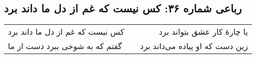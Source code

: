 \begin{center}
\section*{رباعی شماره ۳۶: کس نیست که غم از دل ما داند برد}
\label{sec:036}
\begin{longtable}{l p{0.5cm} r}
کس نیست که غم از دل ما داند برد
&&
یا چارهٔ کار عشق بتواند برد
\\
گفتم که به شوخی ببرد دست از ما
&&
زین دست که او پیاده می‌داند برد
\\
\end{longtable}
\end{center}

